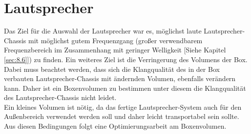 \section{Lautsprecher}\label{subsec:2.1.2}
Das Ziel für die Auswahl der Lautsprecher war es, möglichst laute Lautsprecher-Chassis mit möglichst gutem Frequenzgang (großer verwendbarem Frequenzbereich im Zusammenhang mit geringer Welligkeit [Siehe Kapitel \ref{sec:8.6}]) zu finden.
Ein weiteres Ziel ist die Verringerung des Volumens der Box.
Dabei muss beachtet werden, dass sich die Klangqualität des in der Box verbauten Lautsprecher-Chassis mit ändernden Volumen, ebenfalls verändern kann.
Daher ist ein Boxenvolumen zu bestimmen unter diesem die Klangqualität des Lautsprecher-Chassis nicht leidet.\\
Ein kleines Volumen ist nötig, da das fertige Lautsprecher-System auch für den Außenbereich verwendet werden soll und daher leicht transportabel sein sollte.
Aus diesen Bedingungen folgt eine Optimierungsarbeit am Boxenvolumen.